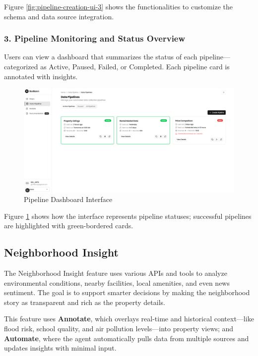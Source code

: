 Figure \ref{fig:pipeline-creation-ui-3} shows the functionalities to customize the schema and data source integration.

\subsubsection*{3. Pipeline Monitoring and Status Overview}

Users can view a dashboard that summarizes the status of each pipeline—categorized as Active, Paused, Failed, or Completed. Each pipeline card is annotated with insights.

\begin{figure}[htbp]
	\centering
	\includegraphics[width=1\textwidth]{assets/ai/pipeline-6.png}
	\caption{Pipeline Dashboard Interface}
	\label{fig:pipeline-creation-ui-4}
\end{figure}

Figure \ref{fig:pipeline-creation-ui-4} shows how the interface represents pipeline statuses; successful pipelines are highlighted with green-bordered cards.

\subsection{Neighborhood Insight}

The Neighborhood Insight feature uses various APIs and tools to analyze environmental conditions, nearby facilities, local amenities, and even news sentiment. The goal is to support smarter decisions by making the neighborhood story as transparent and rich as the property details.

This feature uses \textbf{Annotate}, which overlays real-time and historical context—like flood risk, school quality, and air pollution levels—into property views; and \textbf{Automate}, where the agent automatically pulls data from multiple sources and updates insights with minimal input.

